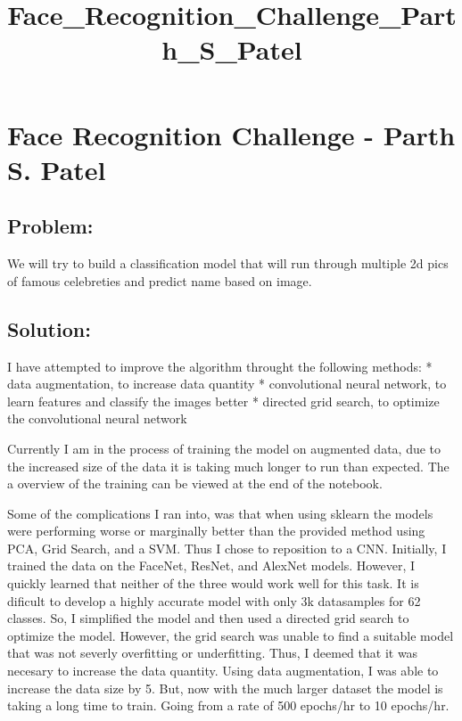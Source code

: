 \documentclass[11pt]{article}
\title{Face\_Recognition\_Challenge\_Parth\_S\_Patel}
\begin{document}
    
    
    \maketitle
    
    

    
    \hypertarget{face-recognition-challenge---parth-s.-patel}{%
\section{Face Recognition Challenge - Parth S.
Patel}\label{face-recognition-challenge---parth-s.-patel}}

    \hypertarget{problem}{%
\subsection{Problem:}\label{problem}}

We will try to build a classification model that will run through
multiple 2d pics of famous celebreties and predict name based on image.

    \hypertarget{solution}{%
\subsection{Solution:}\label{solution}}

    I have attempted to improve the algorithm throught the following
methods: * data augmentation, to increase data quantity * convolutional
neural network, to learn features and classify the images better *
directed grid search, to optimize the convolutional neural network

    Currently I am in the process of training the model on augmented data,
due to the increased size of the data it is taking much longer to run
than expected. The a overview of the training can be viewed at the end
of the notebook.

Some of the complications I ran into, was that when using sklearn the
models were performing worse or marginally better than the provided
method using PCA, Grid Search, and a SVM. Thus I chose to reposition to
a CNN. Initially, I trained the data on the FaceNet, ResNet, and AlexNet
models. However, I quickly learned that neither of the three would work
well for this task. It is dificult to develop a highly accurate model
with only 3k datasamples for 62 classes. So, I simplified the model and
then used a directed grid search to optimize the model. However, the
grid search was unable to find a suitable model that was not severly
overfitting or underfitting. Thus, I deemed that it was necesary to
increase the data quantity. Using data augmentation, I was able to
increase the data size by 5. But, now with the much larger dataset the
model is taking a long time to train. Going from a rate of 500 epochs/hr
to 10 epochs/hr.
\end{document}
